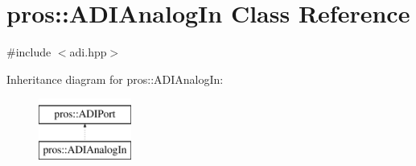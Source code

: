 \hypertarget{classpros_1_1ADIAnalogIn}{}\section{pros\+::A\+D\+I\+Analog\+In Class Reference}
\label{classpros_1_1ADIAnalogIn}


{\ttfamily \#include $<$adi.\+hpp$>$}

Inheritance diagram for pros\+::A\+D\+I\+Analog\+In\+:\begin{figure}[H]
\begin{center}
\leavevmode
\includegraphics[height=2.000000cm]{classpros_1_1ADIAnalogIn}
\end{center}
\end{figure}
